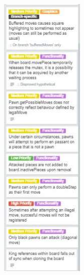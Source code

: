 \documentclass{article}
\begin{document}
\includegraphics[width=4cm]{bugsFixed2.jpg}
\end{document}
